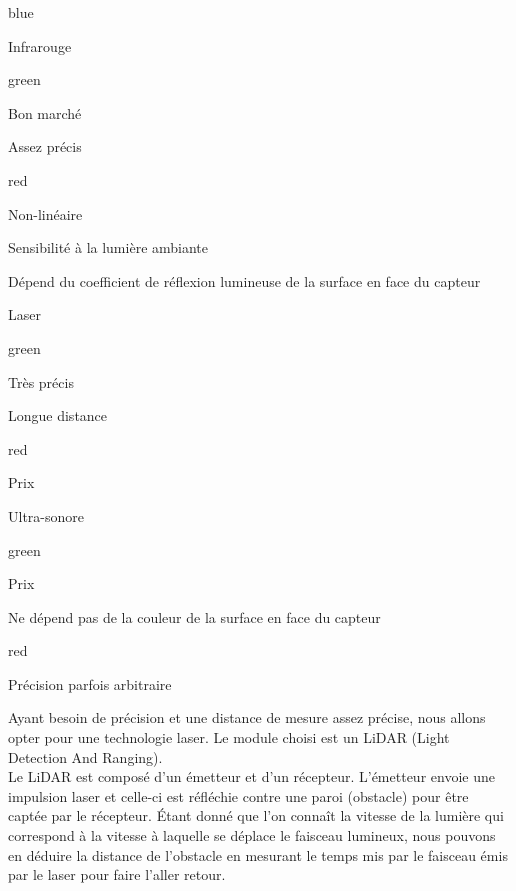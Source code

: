 \begin{items}{blue}{\Circle}
    \item Infrarouge
    \begin{items}{green}{\Circle}
        \item Bon marché
        \item Assez précis
    \end{items}
    \begin{items}{red}{\Circle}
        \item Non-linéaire
        \item Sensibilité à la lumière ambiante
        \item Dépend du coefficient de réflexion lumineuse de la surface en face du capteur
    \end{items}

    \item Laser
    \begin{items}{green}{\Circle}
        \item Très précis
        \item Longue distance
    \end{items}
    \begin{items}{red}{\Circle}
        \item Prix
    \end{items}

    \item Ultra-sonore
    \begin{items}{green}{\Circle}
        \item Prix
        \item Ne dépend pas de la couleur de la surface en face du capteur
    \end{items}
    \begin{items}{red}{\Circle}
        \item Précision parfois arbitraire
    \end{items}
\end{items}

Ayant besoin de précision et une distance de mesure assez précise, nous allons opter pour une technologie laser.
Le module choisi est un LiDAR (Light Detection And Ranging).\\

Le LiDAR est composé d'un émetteur et d'un récepteur. L'émetteur envoie une impulsion laser et celle-ci est réfléchie contre une paroi (obstacle) pour être captée par le récepteur. Étant donné que l'on connaît la vitesse de la lumière qui correspond à la vitesse à laquelle se déplace le faisceau lumineux, nous pouvons en déduire la distance de l'obstacle en mesurant le temps mis par le faisceau émis par le laser pour faire l'aller retour. 



